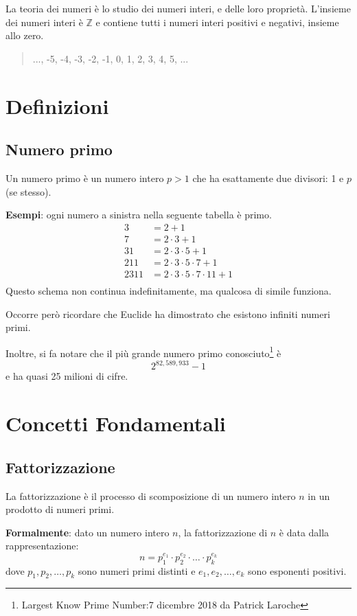 \documentclass[a4paper,12pt]{report}
\begin{document}
La teoria dei numeri è lo studio dei numeri interi, e delle loro proprietà. L'insieme dei numeri interi è $\mathbb{Z}$ e contiene tutti i numeri interi positivi e negativi, insieme allo zero.
\begin{quote}
	\centering
	..., -5, -4, -3, -2, -1,  0,  1,  2,  3,  4,  5, ...
\end{quote}

\section{Definizioni}

\subsection*{Numero primo}
Un numero primo è un numero intero \( p > 1 \) che ha esattamente due divisori: 1 e \(p\) (se stesso).

\textbf{Esempi}: ogni numero a sinistra nella seguente tabella è primo.
\[\begin{array}{ll}
3 & = 2 + 1 \\
7 & = 2 \cdot 3 + 1 \\
31 & = 2 \cdot 3 \cdot 5 + 1 \\
211 & = 2 \cdot 3 \cdot 5 \cdot 7 + 1 \\
2311 & = 2 \cdot 3 \cdot 5 \cdot 7 \cdot 11 + 1 \\
\end{array}\]
Questo schema non continua indefinitamente, ma qualcosa di simile funziona.

Occorre però ricordare che Euclide ha dimostrato che esistono infiniti numeri primi. \cite{stein2008}

Inoltre, si fa notare che il più grande numero primo conosciuto\footnote{Largest Know Prime Number:7 dicembre 2018 da Patrick Laroche} è \[2^{82,589,933} - 1\]
e ha quasi 25 milioni di cifre.

\section{Concetti Fondamentali}
\subsection*{Fattorizzazione}
La fattorizzazione è il processo di scomposizione di un numero intero \( n \) in un prodotto di numeri primi. 

\textbf{Formalmente}: dato un numero intero \( n \), la fattorizzazione di \( n \) è data dalla rappresentazione: 
\[ n = p_1^{e_1} \cdot p_2^{e_2} \cdot \ldots \cdot p_k^{e_k} \]
dove \( p_1, p_2, \ldots, p_k \) sono numeri primi distinti e \( e_1, e_2, \ldots, e_k \) sono esponenti positivi.
\end{document}
